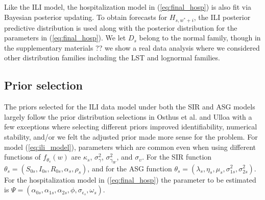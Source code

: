 Like the ILI model, the hospitalization model in (\ref{eq:final_hosp}) is also 
fit via Bayesian posterior updating. To obtain forecasts for $H_{s, w^* + i}$, 
the ILI posterior predictive distribution is used along with the posterior 
distribution for the parameters in (\ref{eq:final_hosp}). 
We let $D_s$ belong to the normal family, though in the supplementary materials
?? we show a real data analysis where we considered other distribution families
including the LST and lognormal families.



\subsection{Prior selection}


The priors selected for the ILI data model under both the SIR and ASG models 
largely follow the prior distribution 
selections in Osthus et al. \cite[]{osthus2019dynamic} 
and Ulloa \cite[]{ulloa2019} with a few exceptions where selecting
different priors improved 
identifiability, 
numerical stability, and/or we felt the adjusted prior made more sense for the 
problem. For model (\ref{eq:ili_model}), parameters which are common even when 
using different functions of $f_{\theta_s}(w)$ are $\kappa_s$, 
$\sigma_{\gamma}^2$, $\sigma_{\gamma_W}^2$, and $\sigma_{\upsilon}$. For the SIR function 
$\theta_s = (S_{0s}, I_{0s}, R_{0s}, \alpha_s, \rho_s)$, and for the ASG 
function $\theta_s = (\lambda_s, \eta_s, \mu_s, \sigma_{1s}^2, \sigma_{2s}^2)$. 
For the hospitalization model in (\ref{eq:final_hosp}) the parameter to be 
estimated is $\Psi = (\alpha_{0s}, \alpha_{1s}, \alpha_{2s}, \phi, \sigma_{\epsilon_s}, \omega_s)$. 


